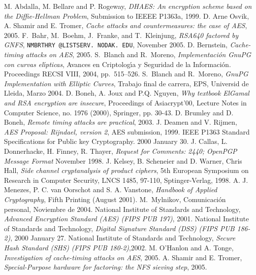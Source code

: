\documentclass{cedi}%
\theoremstyle{plain}        			%
\theoremstyle{definition}   			%
\theoremstyle{saltolinea}   			%
\begin{document}
\providecommand{\bysame}{\leavevmode\hbox to3em{\hrulefill}\thinspace}
\providecommand{\MR}{\relax\ifhmode\unskip\space\fi MR }
\providecommand{\MRhref}[2]{%
  \href{http://www.ams.org/mathscinet-getitem?mr=#1}{#2}
}
\providecommand{\href}[2]{#2}
\begin{thebibliography}{BM04}

 M. Abdalla, M. Bellare and P. Rogeway, \textit{DHAES: An encryption scheme based on the Diffie-Hellman Problem}, Submission to IEEEE P1363a, 1999.
 D. Arne Osvik, A. Shamir and E. Tromer, \textit{Cache attacks and countermeasures: the case of AES}, 2005.
 F.~Bahr, M.~Boehm, J.~Franke, and T.~Kleinjung, \emph{{RSA640 factored by GNFS}}, {\tt NMBRTHRY @LISTSERV. NODAK. EDU}, November 2005.
 D. Bernstein, \textit{Cache-timing attacks on AES}, 2005.
 S.~Blanch and R.~Moreno, \emph{Implementaci\'on {GnuPG} con curvas el\'{\i}pticas}, Avances en Criptolog\'{\i}a y Seguridad de la Informaci\'on. Proceedings {RECSI VIII}, 2004, pp.~515--526.
 S.~Blanch and R.~Moreno, \emph{GnuPG Implementation with Elliptic Curves}, Trabajo final de carrera, EPS, Universid de Lleida, Marzo 2004.
 D. Boneh, A. Joux and P.Q. Nguyen, \textit{Why textbook ElGamal and RSA encryption are insecure}, Proceedings of Asiacrypt'00, Lecture Notes in Computer Science, no. 1976 (2000), Springer, pp. 30-43.
 D. Brumley and D. Boneh, \textit{Remote timing attacks are practical}, 2003.
 J. Deamen and V. Rijmen, \textit{AES Proposal: Rijndael, version 2}, AES submission, 1999.
 IEEE P1363 Standard Specifications for Public key Cryptography. 2000 January 30.
 J. Callas, L. Donnerhacke, H. Finney, R. Thayer, \emph{Request for Comments: 2440; OpenPGP Message Format} November 1998.
 J. Kelsey, B. Scheneier and D. Warner, Chris Hall, \textit{Side channel cryptanalysis of product ciphers}, 5th European Symposium on Research in Computer Security, LNCS 1485, 97-110, Sptinger-Verlag, 1998.
 A. J. Menezes,  P. C. van Oorschot  and  S. A. Vanstone, \textit{Handbook of Applied Cryptography}, Fifth Printing (August 2001).
 M.~Mylnikov, Comunicaci\'on personal, Noviembre de 2004.
 National Institute of Standards and Technology, \textit{Advanced Encryption Standard (AES) (FIPS PUB 197)}, 2001.
 National Institute of Standards and Technology, \textit{Digital Signature Standard (DSS) (FIPS PUB 186-2)}, 2000 January 27.
 National Institute of Standards and Technology, \textit{Secure Hash Standard (SHS) (FIPS PUB 180-2)},2002.
 M. O'Hanlon and A. Tonge, \textit{Investigation of cache-timing attacks on AES}, 2005.
 A. Shamir and E. Tromer, \textit{Special-Purpose hardware for factoring: the NFS sieving step}, 2005.

\end{thebibliography}
\end{document}

